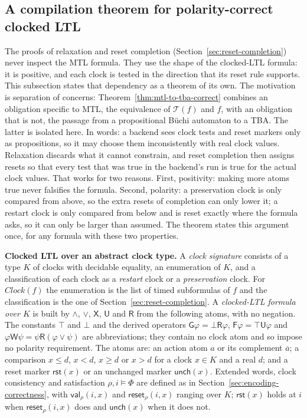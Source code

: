 \documentclass[manuscript]{acmart}
\newcommand{\Until}{\mathbin{\mathsf{U}}}
\newcommand{\Release}{\mathbin{\mathsf{R}}}
\newcommand{\Next}{\mathsf{X}}
\newcommand{\Always}{\mathsf{G}}
\newcommand{\Eventually}{\mathsf{F}}
\newcommand{\WeakUntil}{\mathbin{\mathsf{W}}}
\providecommand{\Reset}{}\renewcommand{\Reset}{\mathsf{rst}}
\newcommand{\Unch}{\mathsf{unch}}
\newcommand{\T}{\mathcal{T}}
\newcommand{\CVal}{\mathsf{val}}
\newcommand{\CReset}{\mathsf{reset}}
\newcommand{\Clock}{\mathit{Clock}}
\newcommand{\runinhead}[1]{\par\noindent\textbf{#1}\enspace}
\begin{document}
\subsection{A compilation theorem for polarity-correct clocked LTL}
\label{subsec:general}

The proofs of relaxation and reset completion
(Section~\ref{sec:reset-completion}) never inspect the MTL formula. They use
the shape of the clocked-LTL formula: it is positive, and each clock is tested
in the direction that its reset rule supports. This subsection states that
dependency as a theorem of its own. The motivation is separation of concerns:
Theorem~\ref{thm:mtl-to-tba-correct} combines an obligation specific to
MTL, the equivalence of $\T(f)$ and $f$, with an obligation that is not, the
passage from a propositional B\"uchi automaton to a TBA. The latter is isolated
here. In words: a backend sees clock tests and reset markers only as
propositions, so it may choose them inconsistently with real clock values.
Relaxation discards what it cannot constrain, and reset completion then
assigns resets so that every test that was true in the backend's run is true
for the actual clock values. That works for two reasons. First, positivity:
making more atoms true never falsifies the formula. Second, polarity: a
preservation clock is only compared from above, so the extra resets of
completion can only lower it; a restart clock is only compared from below and
is reset exactly where the formula asks, so it can only be larger than
assumed. The theorem states this argument once, for any formula with these
two properties.

\runinhead{Clocked LTL over an abstract clock type.}
A \emph{clock signature} consists of a type $K$ of clocks with decidable
equality, an enumeration of $K$, and a classification of each clock as a
\emph{restart} clock or a \emph{preservation} clock. For $\Clock(f)$ the
enumeration is the list of timed subformulas of $f$ and the classification is
the one of Section~\ref{sec:reset-completion}. A \emph{clocked-LTL formula over
$K$} is built by $\land$, $\lor$, $\Next$, $\Until$ and $\Release$ from the
following atoms, with no negation. The constants $\top$ and $\bot$ and the
derived operators $\Always\varphi=\bot\Release\varphi$,
$\Eventually\varphi=\top\Until\varphi$ and
$\varphi\WeakUntil\psi=\psi\Release(\varphi\lor\psi)$ are abbreviations;
they contain no clock atom and so impose no polarity requirement. The atoms are: an action atom $a$ or its complement
$\overline{a}$; a comparison $x\le d$, $x<d$, $x\ge d$ or $x>d$ for a clock
$x\in K$ and a real $d$; and a reset marker $\Reset(x)$ or an unchanged marker
$\Unch(x)$. Extended words, clock consistency and satisfaction
$\rho,i\models\Phi$ are defined as in Section~\ref{sec:encoding-correctness},
with $\CVal_\rho(i,x)$ and $\CReset_\rho(i,x)$ ranging over $K$; $\Reset(x)$
holds at $i$ when $\CReset_\rho(i,x)$ does and $\Unch(x)$ when it does not.
\end{document}
